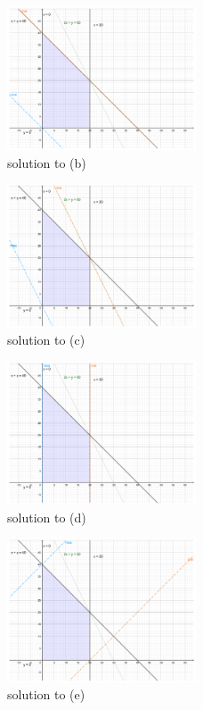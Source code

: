 \documentclass[12pt]{article}
\begin{document}
\begin{figure}[htbp]
  \caption{solution to (b)}
  \centering
    \includegraphics[width=0.5\textwidth]{2_8b.pdf}
\end{figure}
\begin{figure}[htbp]
  \caption{solution to (c)}
  \centering
    \includegraphics[width=0.5\textwidth]{2_8c.pdf}
\end{figure}
\begin{figure}[htbp]
  \caption{solution to (d)}
  \centering
    \includegraphics[width=0.5\textwidth]{2_8d.pdf}
\end{figure}
\begin{figure}[htbp]
  \caption{solution to (e)}
  \centering
    \includegraphics[width=0.5\textwidth]{2_8e.pdf}
\end{figure}
\end{document}

